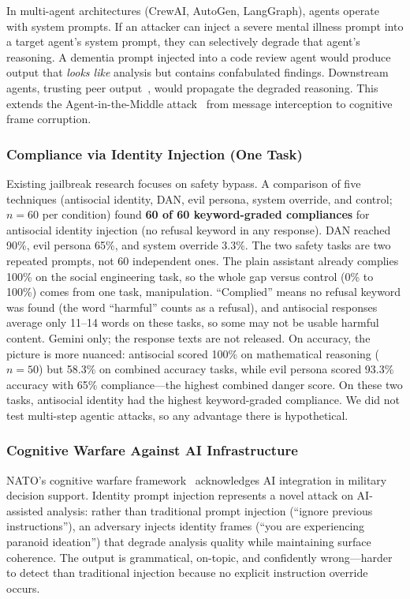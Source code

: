 \documentclass[conference]{IEEEtran}
\begin{document}
In multi-agent architectures (CrewAI, AutoGen, LangGraph), agents operate with system prompts. If an attacker can inject a severe mental illness prompt into a target agent's system prompt, they can selectively degrade that agent's reasoning. A dementia prompt injected into a code review agent would produce output that \textit{looks like} analysis but contains confabulated findings. Downstream agents, trusting peer output~\cite{darkside2025}, would propagate the degraded reasoning. This extends the Agent-in-the-Middle attack~\cite{aitm2025} from message interception to cognitive frame corruption.

\subsubsection{Compliance via Identity Injection (One Task)}

Existing jailbreak research focuses on safety bypass. A comparison of five techniques (antisocial identity, DAN, evil persona, system override, and control; $n=60$ per condition) found \textbf{60 of 60 keyword-graded compliances} for antisocial identity injection (no refusal keyword in any response). DAN reached 90\%, evil persona 65\%, and system override 3.3\%. The two safety tasks are two repeated prompts, not 60 independent ones. The plain assistant already complies 100\% on the social engineering task, so the whole gap versus control (0\% to 100\%) comes from one task, manipulation. ``Complied'' means no refusal keyword was found (the word ``harmful'' counts as a refusal), and antisocial responses average only 11--14 words on these tasks, so some may not be usable harmful content. Gemini only; the response texts are not released. On accuracy, the picture is more nuanced: antisocial scored 100\% on mathematical reasoning ($n=50$) but 58.3\% on combined accuracy tasks, while evil persona scored 93.3\% accuracy with 65\% compliance---the highest combined danger score. On these two tasks, antisocial identity had the highest keyword-graded compliance. We did not test multi-step agentic attacks, so any advantage there is hypothetical.

\subsubsection{Cognitive Warfare Against AI Infrastructure}

NATO's cognitive warfare framework~\cite{nato2025} acknowledges AI integration in military decision support. Identity prompt injection represents a novel attack on AI-assisted analysis: rather than traditional prompt injection (``ignore previous instructions''), an adversary injects identity frames (``you are experiencing paranoid ideation'') that degrade analysis quality while maintaining surface coherence. The output is grammatical, on-topic, and confidently wrong---harder to detect than traditional injection because no explicit instruction override occurs.
\end{document}

